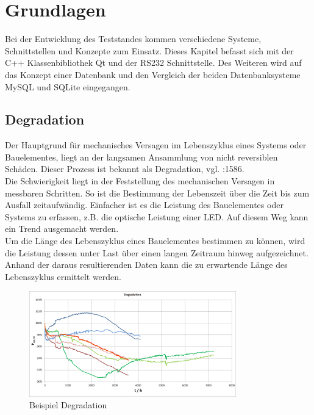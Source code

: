 \chapter{Grundlagen}
\label{chapter_Grundlagen}

Bei der Entwicklung des Teststandes kommen verschiedene Systeme, Schnittstellen und Konzepte zum Einsatz. Dieses Kapitel befasst sich mit der C++ Klassenbibliothek Qt und der RS232 Schnittstelle. Des Weiteren wird auf das Konzept einer Datenbank und den Vergleich der beiden Datenbanksysteme MySQL und SQLite eingegangen.

\section{Degradation}
\label{section_Degradation}
Der Hauptgrund für mechanisches Versagen im Lebenszyklus eines Systems oder Bauelementes, liegt an der langsamen Ansammlung von nicht reversiblen Schäden. Dieser Prozess ist bekannt als Degradation, vgl. \cite{zhou2011}:1586.\\
Die Schwierigkeit liegt in der Feststellung des mechanischen Versagen in messbaren Schritten. So ist die Bestimmung der Lebenszeit über die Zeit bis zum Ausfall zeitaufwändig. Einfacher ist es die Leistung des Bauelementes oder Systems zu erfassen, z.B. die optische Leistung einer LED. Auf diesem Weg kann ein Trend ausgemacht werden.\\
Um die Länge des Lebenszyklus eines Bauelementes bestimmen zu können, wird die Leistung dessen unter Last über einen langen Zeitraum hinweg aufgezeichnet. Anhand der daraus resultierenden Daten kann die zu erwartende Länge des Lebenszyklus ermittelt werden.

 
\begin{figure}[H]
\begin{center}
\includegraphics[width=0.8\textwidth]{img/general/Degradation.png}
\caption{Beispiel Degradation}
\label{figure_Degradation}
\end{center}
\end{figure}



